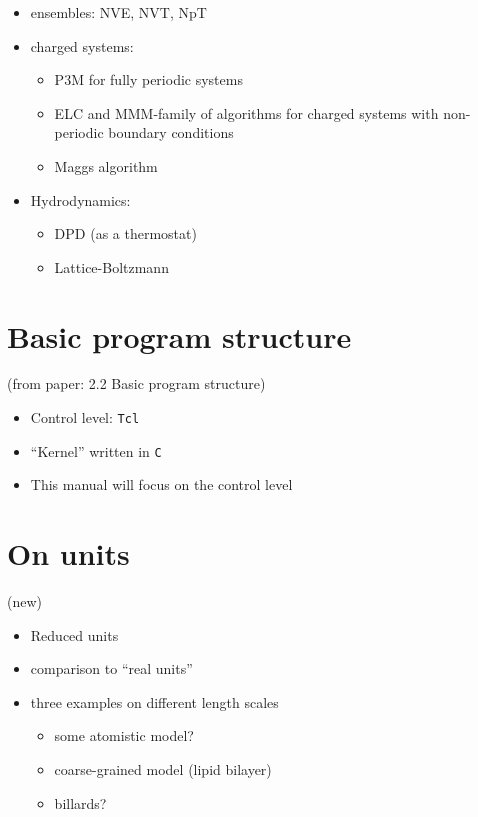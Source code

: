 \begin{itemize}
\item ensembles: NVE, NVT, NpT
\item charged systems:
  \begin{itemize}
  \item P3M for fully periodic systems
  \item ELC and MMM-family of algorithms for charged systems with
    non-periodic boundary conditions
  \item Maggs algorithm 
  \end{itemize}
\item Hydrodynamics:
  \begin{itemize}
  \item DPD (as a thermostat)
  \item Lattice-Boltzmann
  \end{itemize}
\end{itemize}

\section{Basic program structure}
\label{sec:structure}

(from paper: 2.2 Basic program structure)

\begin{itemize}
\item Control level: \texttt{Tcl}
\item ``Kernel'' written in \texttt{C}
\item This manual will focus on the control level
\end{itemize}

\section{On units}
\label{sec:units}
(new)

\begin{itemize}
\item Reduced units
\item comparison to ``real units''
\item three examples on different length scales
  \begin{itemize}
  \item some atomistic model?
  \item coarse-grained model (\eg lipid bilayer)
  \item billards?
  \end{itemize}
\end{itemize}

